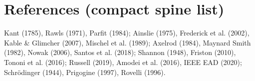 \documentclass[11pt]{article}
\begin{document}
\section*{References (compact spine list)}
Kant (1785), Rawls (1971), Parfit (1984);\newline
Ainslie (1975), Frederick et al. (2002), Kable \& Glimcher (2007), Mischel et al. (1989);\newline
Axelrod (1984), Maynard Smith (1982), Nowak (2006), Santos et al. (2018);\newline
Shannon (1948), Friston (2010), Tononi et al. (2016);\newline
Russell (2019), Amodei et al. (2016), IEEE EAD (2020);\newline
Schr\"odinger (1944), Prigogine (1997), Rovelli (1996).
\end{document}
